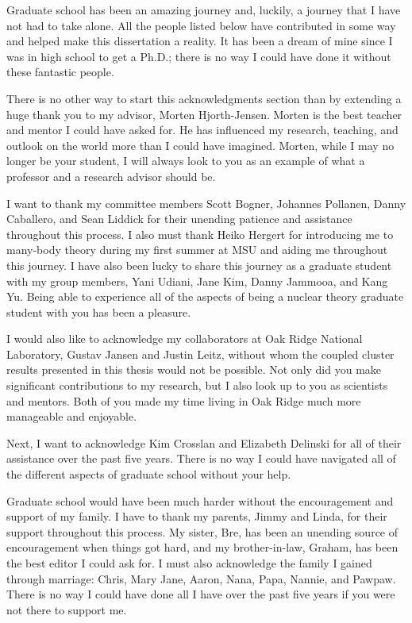 Graduate school has been an amazing journey and, luckily, a journey that I have not had to take alone. All the people listed below have contributed in some way and helped make this dissertation a reality. It has been a dream of mine since I was in high school to get a Ph.D.; there is no way I could have done it without these fantastic people.

There is no other way to start this acknowledgments section than by extending a huge thank you to my advisor, Morten Hjorth-Jensen.  Morten is the best teacher and mentor I could have asked for. He has influenced my research, teaching, and outlook on the world more than I could have imagined. Morten, while I may no longer be your student, I will always look to you as an example of what a professor and a research advisor should be. 

I want to thank my committee members Scott Bogner, Johannes Pollanen, Danny Caballero, and Sean Liddick for their unending patience and assistance throughout this process. I also must thank Heiko Hergert for introducing me to many-body theory during my first summer at MSU and aiding me throughout this journey. I have also been lucky to share this journey as a graduate student with my group members, Yani Udiani, Jane Kim, Danny Jammooa, and Kang Yu. Being able to experience all of the aspects of being a nuclear theory graduate student with you has been a pleasure.

I would also like to acknowledge my collaborators at Oak Ridge National Laboratory, Gustav Jansen and Justin Leitz, without whom the coupled cluster results presented in this thesis would not be possible. Not only did you make significant contributions to my research, but I also look up to you as scientists and mentors. Both of you made my time living in Oak Ridge much more manageable and enjoyable.

Next, I want to acknowledge Kim Crosslan and Elizabeth Delinski for all of their assistance over the past five years.  There is no way I could have navigated all of the different aspects of graduate school without your help.

Graduate school would have been much harder without the encouragement and support of my family. I have to thank my parents, Jimmy and Linda, for their support throughout this process. My sister, Bre, has been an unending source of encouragement when things got hard, and my brother-in-law, Graham, has been the best editor I could ask for. I must also acknowledge the family I gained through marriage: Chris, Mary Jane, Aaron, Nana, Papa, Nannie, and Pawpaw. There is no way I could have done all I have over the past five years if you were not there to support me.

